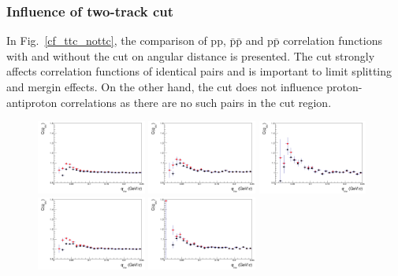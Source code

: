 \subsubsection{Influence of two-track cut}
In Fig.~\ref{cf_ttc_nottc}, the comparison of pp, $\bar{\mathrm{p}}\bar{\mathrm{p}}$ and p$\bar{\mathrm{p}}$ correlation functions with and without the cut on angular distance is presented. The cut strongly affects correlation functions of identical pairs and is important to limit splitting and mergin effects. On the other hand, the cut does not influence proton-antiproton correlations as there are no such pairs in the cut region.
\begin{figure}%
  \centering
  \includegraphics[width=0.32\textwidth]{cmp_dcatpconly11h_ttc_nottc_cen0/PP}
  \includegraphics[width=0.32\textwidth]{cmp_dcatpconly11h_ttc_nottc_cen2/PP}
  \includegraphics[width=0.32\textwidth]{cmp_dcatpconly11h_ttc_nottc_cen4/PP}
  \includegraphics[width=0.32\textwidth]{cmp_dcatpconly11h_ttc_nottc_cen0/APAP}
  \includegraphics[width=0.32\textwidth]{cmp_dcatpconly11h_ttc_nottc_cen2/APAP}

\end{figure}

